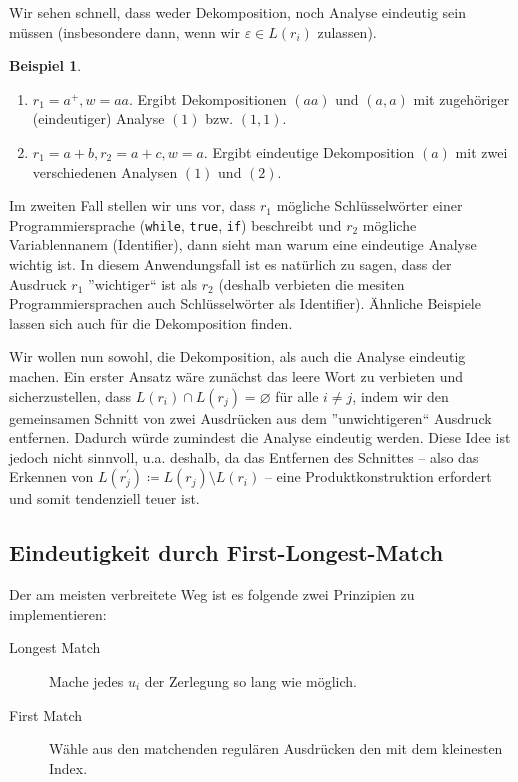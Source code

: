 \documentclass[11pt, a4paper]{article}
\let\emptyset\varnothing
\theoremstyle{definition}
\newtheorem{example}[definition]{Beispiel}
\theoremstyle{plain}
\begin{document}
Wir sehen schnell, dass weder Dekomposition, noch Analyse eindeutig sein müssen (insbesondere dann, wenn wir \( \varepsilon \in L(r_i) \) zulassen).
\begin{example}
	\begin{enumerate}
		\item \( r_1 = a^+, w = aa \). Ergibt Dekompositionen \( (aa) \) und \( (a, a) \) mit zugehöriger (eindeutiger) Analyse \( (1) \) bzw. \( (1, 1) \).
		\item \( r_1 = a+b, r_2 = a+c, w = a \). Ergibt eindeutige Dekomposition \( (a) \) mit zwei verschiedenen Analysen \( (1) \) und \( (2) \).	
	\end{enumerate}
	Im zweiten Fall stellen wir uns vor, dass \( r_1 \) mögliche Schlüsselwörter einer Programmiersprache (\texttt{while}, \texttt{true}, \texttt{if}) beschreibt und \( r_2 \) mögliche Variablennanem (Identifier), dann sieht man warum eine eindeutige Analyse wichtig ist. In diesem Anwendungsfall ist es natürlich zu sagen, dass der Ausdruck \( r_1 \) ''wichtiger`` ist als \( r_2 \) (deshalb verbieten die mesiten Programmiersprachen auch Schlüsselwörter als Identifier). Ähnliche Beispiele lassen sich auch für die Dekomposition finden.
\end{example}

Wir wollen nun sowohl, die Dekomposition, als auch die Analyse eindeutig machen. Ein erster Ansatz wäre zunächst das leere Wort zu verbieten und sicherzustellen, dass \( L(r_i) \cap L(r_j) = \emptyset \) für alle \( i \neq j \), indem wir den gemeinsamen Schnitt von zwei Ausdrücken aus dem ''unwichtigeren`` Ausdruck entfernen. Dadurch würde zumindest die Analyse eindeutig werden. Diese Idee ist jedoch nicht sinnvoll, u.a. deshalb, da das Entfernen des Schnittes -- also das Erkennen von \( L(r_j^\prime) \coloneqq L(r_j) \setminus L(r_i) \) -- eine Produktkonstruktion erfordert und somit tendenziell teuer ist.


\subsection*{Eindeutigkeit durch First-Longest-Match}
Der am meisten verbreitete Weg ist es folgende zwei Prinzipien zu implementieren:
\begin{description}
	\item[Longest Match] Mache jedes \( u_i \) der Zerlegung so lang wie möglich.
	\item[First Match] Wähle aus den matchenden regulären Ausdrücken den mit dem kleinesten Index.
\end{description}
\end{document}

